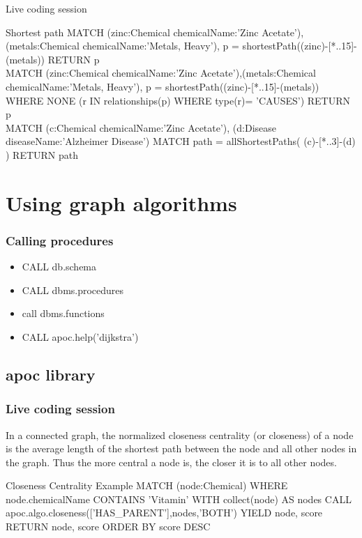 \documentclass[12pt]{beamer}
\begin{document}
    \begin{frame}{Live coding session}
        \begin{block}{Shortest path}
            MATCH (zinc:Chemical {chemicalName:'Zinc Acetate'}),(metals:Chemical {chemicalName:'Metals, Heavy'}), p = shortestPath((zinc)-[*..15]-(metals))
            RETURN p\\
            
            MATCH (zinc:Chemical {chemicalName:'Zinc Acetate'}),(metals:Chemical {chemicalName:'Metals, Heavy'}), p = shortestPath((zinc)-[*..15]-(metals)) 
            WHERE NONE (r IN relationships(p) WHERE type(r)= 'CAUSES')
            RETURN p\\
            
            MATCH (c:Chemical {chemicalName:'Zinc Acetate'}), (d:Disease {diseaseName:'Alzheimer Disease'})
            MATCH path = allShortestPaths( (c)-[*..3]-(d) )
            RETURN path
        \end{block}
    \end{frame}
    
    \section{Using graph algorithms}
    \begin{frame}
        \frametitle{Calling procedures}
        \begin{itemize}
            \item CALL db.schema
            \item CALL dbms.procedures
            \item call dbms.functions
            \item CALL apoc.help('dijkstra')
        \end{itemize}
    \end{frame}
    
    \subsection{apoc library}
    \begin{frame}
        \frametitle{Live coding session}
        \begin{Definition}
            In a connected graph, the normalized closeness centrality (or closeness) of a node is the average length of the shortest path between the node and all other nodes in the graph. Thus the more central a node is, the closer it is to all other nodes.\footnotemark
        \end{Definition}
        \begin{block}{Closeness Centrality Example}
            MATCH (node:Chemical)
            WHERE node.chemicalName CONTAINS 'Vitamin'
            WITH collect(node) AS nodes
            CALL apoc.algo.closeness(['HAS\_PARENT'],nodes,'BOTH') YIELD node, score
            RETURN node, score
            ORDER BY score DESC
        \end{block}
    \end{frame}
    
\end{document}
